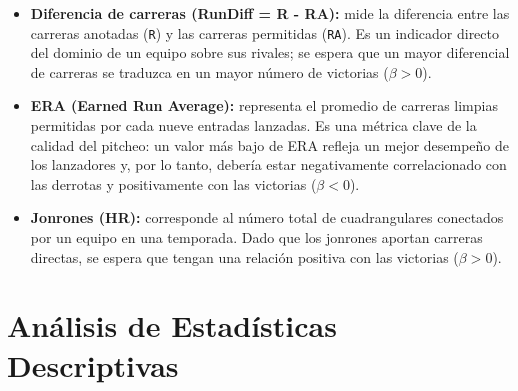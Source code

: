 \documentclass[man,floatsintext]{apa7}
\begin{document}
\begin{itemize}
    \item \textbf{Diferencia de carreras (RunDiff = R - RA):} mide la diferencia entre las carreras anotadas (\texttt{R}) y las carreras permitidas (\texttt{RA}). Es un indicador directo del dominio de un equipo sobre sus rivales; se espera que un mayor diferencial de carreras se traduzca en un mayor número de victorias (\(\beta > 0\)). 
    \item \textbf{ERA (Earned Run Average):} representa el promedio de carreras limpias permitidas por cada nueve entradas lanzadas. Es una métrica clave de la calidad del pitcheo: un valor más bajo de ERA refleja un mejor desempeño de los lanzadores y, por lo tanto, debería estar negativamente correlacionado con las derrotas y positivamente con las victorias (\(\beta < 0\)). 
    \item \textbf{Jonrones (HR):} corresponde al número total de cuadrangulares conectados por un equipo en una temporada. Dado que los jonrones aportan carreras directas, se espera que tengan una relación positiva con las victorias (\(\beta > 0\)).
\end{itemize}
\section{Análisis de Estadísticas Descriptivas}
\end{document}
